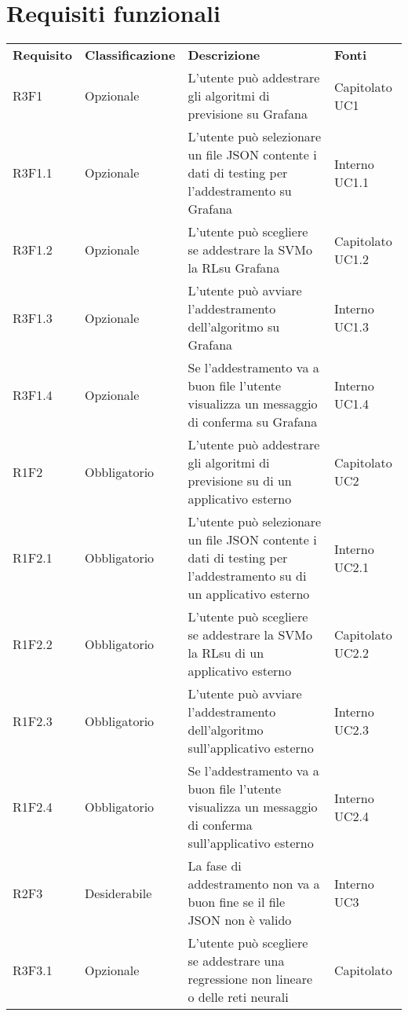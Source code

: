 \section{Requisiti funzionali}
	\begin{longtable} {
		>{}p{24mm} 
		>{}p{32mm}
		>{}p{40mm} 
		>{}p{24.5mm}
		}
	\rowcolor{gray!50}
		\textbf{Requisito} & \textbf{Classificazione} & \textbf{Descrizione} & \textbf{Fonti} 	\TBstrut \\
		R3F1 & Opzionale & L'utente può addestrare gli algoritmi di previsione su Grafana\glo & Capitolato UC1 \TBstrut \\ [2mm]
		R3F1.1 & Opzionale & L'utente può selezionare un file JSON contente i dati di testing per l'addestramento su Grafana\glo & Interno UC1.1 \TBstrut \\ [2mm]
		R3F1.2 & Opzionale & L'utente può scegliere se addestrare la SVM\glosp o la RL\glosp su Grafana\glo & Capitolato UC1.2 \TBstrut \\ [2mm]
		R3F1.3 & Opzionale & L'utente può avviare l'addestramento dell'algoritmo su Grafana\glo & Interno UC1.3 \TBstrut \\ [2mm]
		R3F1.4 & Opzionale & Se l'addestramento va a buon file l'utente visualizza un messaggio di conferma su Grafana\glo & Interno UC1.4 \TBstrut \\ [2mm]
		R1F2 & Obbligatorio & L'utente può addestrare gli algoritmi di previsione su di un applicativo esterno & Capitolato UC2 \TBstrut \\ [2mm]
		R1F2.1 & Obbligatorio & L'utente può selezionare un file JSON contente i dati di testing per l'addestramento su di un applicativo esterno & Interno UC2.1 \TBstrut \\ [2mm]
		R1F2.2 & Obbligatorio & L'utente può scegliere se addestrare la SVM\glosp o la RL\glosp su di un applicativo esterno & Capitolato UC2.2 \TBstrut \\ [2mm]
		R1F2.3 & Obbligatorio & L'utente può avviare l'addestramento dell'algoritmo sull'applicativo esterno & Interno UC2.3 \TBstrut \\ [2mm]
		R1F2.4 & Obbligatorio & Se l'addestramento va a buon file l'utente visualizza un messaggio di conferma sull'applicativo esterno & Interno UC2.4 \TBstrut \\ [2mm]
		R2F3 & Desiderabile & La fase di addestramento non va a buon fine se il file JSON non è valido & Interno UC3 \TBstrut \\ [2mm]
		R3F3.1 & Opzionale & L'utente può scegliere se addestrare una regressione non lineare o delle reti neurali\glo & Capitolato \TBstrut \\ [2mm]

\end{longtable}

